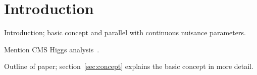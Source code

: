 \section{Introduction}
\label{sec:introduction}

Introduction; basic concept and parallel with continuous nuisance parameters.

Mention CMS Higgs analysis~\cite{ref:introduction:higgs}.

Outline of paper; section~\ref{sec:concept} explains the basic concept in more
detail.
